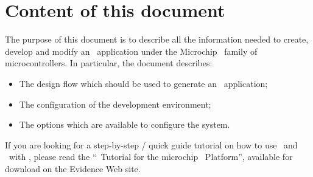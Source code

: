 \section{Content of this document}

The purpose of this document is to describe all the information needed
to create, develop and modify an \ee\ application under the Microchip
\dspic\ family of microcontrollers. In particular, the document describes:
\begin{itemize}
\item The design flow which should be used to generate an \ee\ application;
\item The configuration of the development environment;
\item The options which are available to configure the system.
\end{itemize}

\begin{note}
If you are looking for a step-by-step / quick guide tutorial on how to
use \ee\ and \rtd\ with \dspic, please read the ``\ee\
Tutorial for the microchip \dspic\ Platform'', available for download on
the Evidence Web site.
\end{note}

